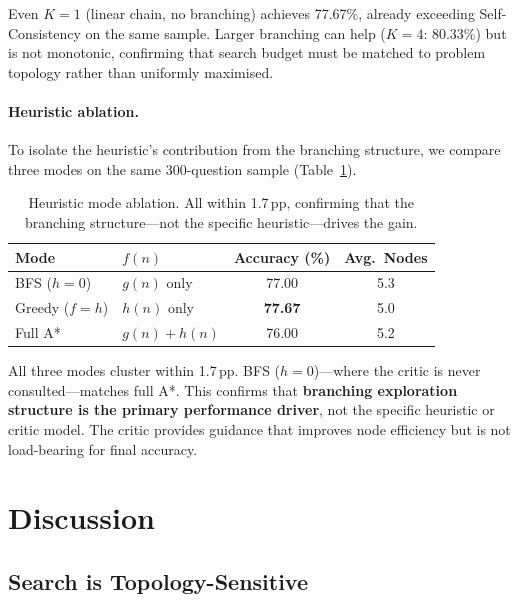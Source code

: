 \documentclass{article}
\newcommand{\pp}{\,pp\xspace}
\begin{document}
Even $K{=}1$ (linear chain, no branching) achieves 77.67\%, already exceeding
Self-Consistency on the same sample.  Larger branching can help ($K{=}4$:
80.33\%) but is not monotonic, confirming that search budget must be matched
to problem topology rather than uniformly maximised.

\paragraph{Heuristic ablation.}
To isolate the heuristic's contribution from the branching structure, we
compare three modes on the same 300-question sample
(Table~\ref{tab:heuristic_ablation}).

\begin{table}[t]
\centering
\caption{Heuristic mode ablation.  All within 1.7\pp, confirming that the
branching structure---not the specific heuristic---drives the gain.}
\label{tab:heuristic_ablation}
\small
\begin{tabular}{@{}llcc@{}}
\toprule
\textbf{Mode} & $f(n)$ & \textbf{Accuracy (\%)} & \textbf{Avg.\ Nodes} \\
\midrule
BFS ($h{=}0$)    & $g(n)$ only       & 77.00 & 5.3 \\
Greedy ($f{=}h$) & $h(n)$ only       & \textbf{77.67} & 5.0 \\
Full A*          & $g(n){+}h(n)$     & 76.00 & 5.2 \\
\bottomrule
\end{tabular}
\end{table}

All three modes cluster within 1.7\pp.  BFS ($h{=}0$)---where the
critic is never consulted---matches full A*.  This confirms that
\textbf{branching exploration structure is the primary performance driver},
not the specific heuristic or critic model.  The critic provides guidance that
improves node efficiency but is not load-bearing for final accuracy.

\section{Discussion}
\label{sec:discussion}

\subsection{Search is Topology-Sensitive}
\end{document}

